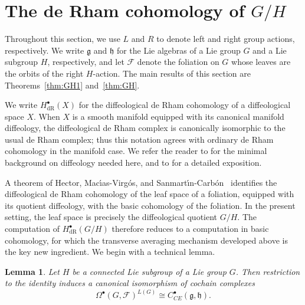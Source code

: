 \documentclass[reqno, 11pt]{amsart}
\newtheorem{lem}[thm]{Lemma}
\theoremstyle{definition}
\theoremstyle{property}
\theoremstyle{remark}
\numberwithin{equation}{section}
\begin{document}
\section{The de Rham cohomology of $G/H$}
\label{De Rham of G/H}

Throughout this section, we use $L$ and $R$ to denote left and right group
actions, respectively. We write $\mathfrak g$ and $\mathfrak h$ for the Lie
algebras of a Lie group $G$ and a Lie subgroup $H$, respectively, and let
$\mathcal F$ denote the foliation on $G$ whose leaves are the orbits of the
right $H$-action. The main results of this section are
Theorems~\ref{thm:GH1} and~\ref{thm:GH}.

We write $H^\bullet_{\mathrm{dR}}(X)$ for the diffeological de Rham cohomology
of a diffeological space $X$. When $X$ is a smooth manifold equipped with its
canonical manifold diffeology, the diffeological de Rham complex is canonically
isomorphic to the usual de Rham complex; thus this notation agrees with ordinary
de Rham cohomology in the manifold case. We refer the reader to \cite{L26} for
the minimal background on diffeology needed here, and to \cite{I13} for a
detailed exposition.

A theorem of Hector, Mac\'{\i}as-Virg\'os, and
Sanmart\'{\i}n-Carb\'on~\cite[Theorem~3.5]{HMS} identifies the diffeological
de Rham cohomology of the leaf space of a foliation, equipped with its quotient
diffeology, with the basic cohomology of the foliation. In the present setting,
the leaf space is precisely the diffeological quotient $G/H$. The computation
of $H^\bullet_{\mathrm{dR}}(G/H)$ therefore reduces to a computation in basic
cohomology, for which the transverse averaging mechanism developed above is
the key new ingredient. We begin with a technical lemma.


\begin{lem}\label{basic-relative}
Let $H$ be a connected Lie subgroup of a Lie group $G$. Then restriction to
the identity induces a canonical isomorphism of cochain complexes
\[
\Omega^\bullet(G,\mathcal F)^{L(G)} \cong C^\bullet_{CE}(\mathfrak g,\mathfrak h).
\]\end{lem}
\end{document}
